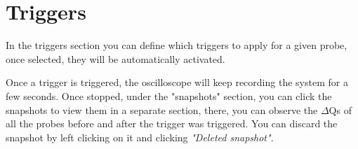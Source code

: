 \section{Triggers}
    In the triggers section you can define which triggers to apply for a given probe, once selected, they will be automatically activated.

    Once a trigger is triggered, the oscilloscope will keep recording the system for a few seconds. Once stopped, under the "snapshots" section, you can click the snapshots to view them in a separate section, there, you can observe the $\Delta$Qs of all the probes before and after the trigger was triggered. You can discard the snapshot by left clicking on it and clicking \textit{"Deleted snapshot"}.
